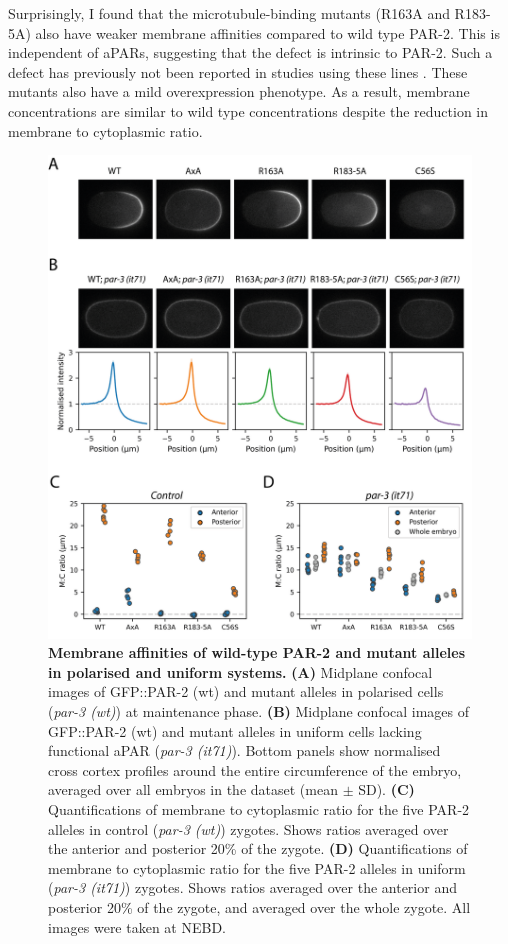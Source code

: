 \documentclass[12pt]{"report"}
\newcommand{\mycaption}[2]{\caption[#1]{\textbf{#1.} #2}}
\begin{document}
Surprisingly, I found that the microtubule-binding mutants (R163A and R183-5A) also have weaker membrane affinities compared to wild type PAR-2. This is independent of aPARs, suggesting that the defect is intrinsic to PAR-2. Such a defect has previously not been reported in studies using these lines \citep{Motegi2011, Gross2018}. These mutants also have a mild overexpression phenotype. As a result, membrane concentrations are similar to wild type concentrations despite the reduction in membrane to cytoplasmic ratio.\\

\begin{figure}
\includegraphics[scale=1]{par2_misc_mutants_quantification}
\centering
\mycaption{Membrane affinities of wild-type PAR-2 and mutant alleles in polarised and uniform systems}{
\textbf{(A)} Midplane confocal images of GFP::PAR-2 (wt) and mutant alleles in polarised cells (\textit{par-3 (wt)}) at maintenance phase.
\textbf{(B)} Midplane confocal images of GFP::PAR-2 (wt) and mutant alleles in uniform cells lacking functional aPAR (\textit{par-3 (it71)}). Bottom panels show normalised cross cortex profiles around the entire circumference of the embryo, averaged over all embryos in the dataset (mean $\pm$ SD).
\textbf{(C)} Quantifications of membrane to cytoplasmic ratio for the five PAR-2 alleles in control (\textit{par-3 (wt)}) zygotes. Shows ratios averaged over the anterior and posterior 20\% of the zygote.
\textbf{(D)} Quantifications of membrane to cytoplasmic ratio for the five PAR-2 alleles in uniform (\textit{par-3 (it71)}) zygotes. Shows ratios averaged over the anterior and posterior 20\% of the zygote, and averaged over the whole zygote. All images were taken at NEBD.
}
\label{fig:par2_misc_mutants_quantification}
\end{figure}
\end{document}
